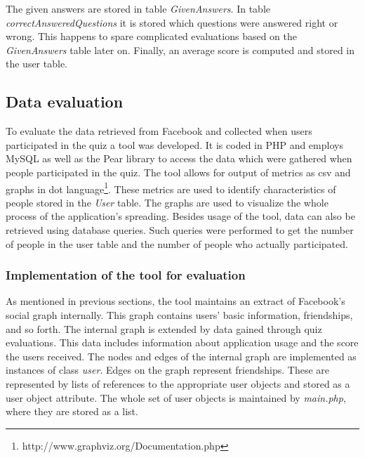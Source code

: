 \documentclass[preprint,12pt]{elsarticle}
\begin{document}
The given answers are stored in table \textit{GivenAnswers}. In
table \textit{correctAnsweredQuestions} it is stored which questions
were answered right or wrong. This happens to spare complicated
evaluations based on the \textit{GivenAnswers} table later on.
Finally, an average score is computed and stored in the user table.




\subsection{Data evaluation}
\label{sec:data-evaluation}
To evaluate the data retrieved from Facebook and collected when users
participated in the quiz  a tool was developed. It is coded in PHP and
employs MySQL as well as the Pear library to access the
data which were gathered when people participated in the quiz. The
tool allows for output of metrics as \ac{csv} and graphs in \ac{dot}
language\footnote{http://www.graphviz.org/Documentation.php}. These
metrics are used to identify characteristics of people stored in
the \textit{User} table. The graphs are used to visualize the whole
process of the application's spreading. 
Besides usage of the tool, data can also be retrieved using database
queries. Such queries were performed to get the number of people in the user table and
the number of people who actually participated.

\subsubsection{Implementation of the tool for evaluation}
\label{sec:impl-tool-eval}
As mentioned in previous sections, the tool maintains an extract of
Facebook's social graph internally. This graph contains users' basic
information, friendships, and so forth. The internal graph is
extended by data gained through quiz evaluations. This data includes
information about application usage and the score the users
received. The nodes and edges of the internal graph 
are implemented as instances of class \textit{user}. Edges on the
graph represent friendships. These are represented by lists of
references to the appropriate user objects and stored as a user object
attribute.
The whole set of user objects is
maintained by \textit{main.php}, where they are stored as a list.
\end{document}
